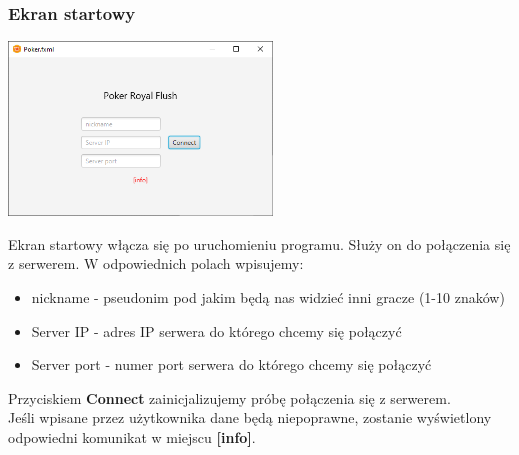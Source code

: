 \documentclass{article}
\begin{document}
        \subsubsection{Ekran startowy}
            \begin{center}
                \includegraphics[width=70mm]{gui_start.png}
            \end{center}
            Ekran startowy włącza się po uruchomieniu programu. Służy on do połączenia się z serwerem.
            W odpowiednich polach wpisujemy:
            \begin{itemize}
                \item nickname - pseudonim pod jakim będą nas widzieć inni gracze (1-10 znaków)
                \item Server IP - adres IP serwera do którego chcemy się połączyć
                \item Server port - numer port serwera do którego chcemy się połączyć
            \end{itemize}
            Przyciskiem \textbf{Connect} zainicjalizujemy próbę połączenia się z serwerem.\\
            Jeśli wpisane przez użytkownika dane będą niepoprawne, zostanie wyświetlony odpowiedni komunikat w miejscu \textbf{[info]}.
            
\end{document}
